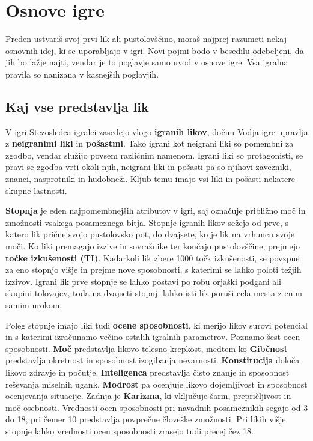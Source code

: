 \section{Osnove igre}

Preden ustvariš svoj prvi lik ali pustolovščino, moraš najprej razumeti nekaj osnovnih idej, ki se uporabljajo v igri. Novi pojmi bodo v besedilu odebeljeni, da jih bo lažje najti, vendar je to poglavje samo uvod v osnove igre. Vsa igralna pravila so nanizana v kasnejših poglavjih.

\subsection{Kaj vse predstavlja lik}

V igri Stezosledca igralci zasedejo vlogo \textbf{igranih likov}, dočim Vodja igre upravlja z \textbf{neigranimi liki} in \textbf{pošastmi}. Tako igrani kot neigrani liki so pomembni za zgodbo, vendar služijo povsem različnim namenom. Igrani liki so protagonisti, se pravi se zgodba vrti okoli njih, neigrani liki in pošasti pa so njihovi zavezniki, znanci, nasprotniki in hudobneži. Kljub temu imajo vsi liki in pošasti nekatere skupne lastnosti.

\textbf{Stopnja} je eden najpomembnejših atributov v igri, saj označuje približno moč in zmožnosti vsakega posameznega bitja. Stopnje igranih likov sežejo od prve, s katero lik prične svojo pustolovsko pot, do dvajsete, ko je lik na vrhuncu svoje moči. Ko liki premagajo izzive in sovražnike ter končajo pustolovščine, prejmejo \textbf{točke izkušenosti (TI)}. Kadarkoli lik zbere 1000 točk izkušenosti, se povzpne za eno stopnjo višje in prejme nove sposobnosti, s katerimi se lahko poloti težjih izzivov. Igrani lik prve stopnje se lahko postavi po robu orjaški podgani ali skupini tolovajev, toda na dvajseti stopnji lahko isti lik poruši cela mesta z enim samim urokom.

Poleg stopnje imajo liki tudi \textbf{ocene sposobnosti}, ki merijo likov surovi potencial in s katerimi izračunamo večino ostalih igralnih parametrov. Poznamo šest ocen sposobnosti. \textbf{Moč} predstavlja likovo telesno krepkost, medtem ko \textbf{Gibčnost} predstavlja okretnost in sposobnost izogibanja nevarnosti. \textbf{Konstitucija} določa likovo zdravje in počutje. \textbf{Inteligenca} predstavlja čisto znanje in sposobnost reševanja miselnih ugank, \textbf{Modrost} pa ocenjuje likovo dojemljivost in sposobnost ocenjevanja situacije. Zadnja je \textbf{Karizma}, ki vključuje šarm, prepričljivost in moč osebnosti. Vrednosti ocen sposobnosti pri navadnih posameznikih segajo od 3 do 18, pri čemer 10 predstavlja povprečne človeške zmožnosti. Pri likih višje stopnje lahko vrednosti ocen sposobnosti zrasejo tudi precej čez 18.

